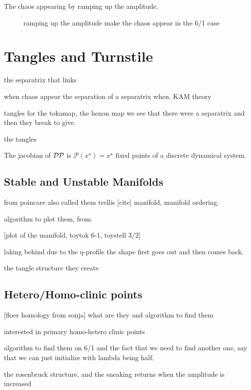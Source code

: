 The chaos appearing by ramping up the amplitude.

\begin{figure}[h!]
    \hfill
    \caption{ramping up the amplitude make the chaos appear in the 6/1 case}
\end{figure}

\chapter{Tangles and Turnstile}

the separatrix that links 

when chaos appear the separation of a separatrix when.
KAM theory

tangles for the tokamap, the henon map
we see that there were a separatrix and then they break to give.

the tangles

The jacobian of $\mathcal{D}\mathcal{P}$ is $\mathcal{P}(x^\star) = x^\star$ fixed points of a discrete dynamical system.

\section{Stable and Unstable Manifolds}

from poincare also called them trellis [cite]
manifold, manifold ordering.

algorithm to plot them, from.

[plot of the manifold, toytok 6-1, toystell 3/2]

laking behind due to the q-profile
the shape first goes out and then comes back.

the tangle structure they create

\section{Hetero/Homo-clinic points}
[floer homology from sonja]
what are they and algorithm to find them

interested in primary homo-hetero clinic points

algorithm to find them on 6/1 and the fact that we need to find another one, say that we can just initialize with lambda being half.

the rosenbruck structure, and the sneaking returns when the amplitude is increased

